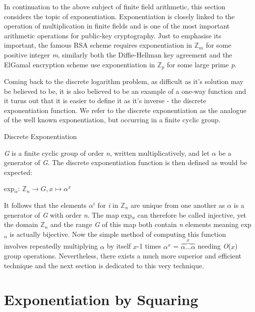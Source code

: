 \documentclass[iwp,first]{luthesis}
\begin{document}
In continuation to the above subject of finite field arithmetic, this section considers the topic of exponentiation. Exponentiation is closely linked to the operation of multiplication in finite fields and is one of the most important arithmetic operations for public-key cryptography. Just to emphasise its important, the famous RSA scheme requires exponentiation in $\mathbb{Z}_m$ for some positive integer \textit{m}, similarly both the Diffie-Hellman key agreement and the ElGamal encryption scheme use exponentiation in $\mathbb{Z}_p$ for some large prime \textit{p}.

Coming back to the discrete logarithm problem, as difficult as it's solution may be believed to be, it is also believed to be an example of a one-way function and it turns out that it is easier to define it as it's inverse - the discrete exponentiation function. We refer to the discrete exponentiation as the analogue of the well known exponentiation, but occurring in a finite cyclic group. 

\begin{mydef}
Discrete Exponentiation
\end{mydef}

\textit{G} is a finite cyclic group of order \textit{n}, written multiplicatively, and let $\alpha$ be a generator of \textit{G}. The discrete exponentiation function is then defined as would be expected:

\begin{center}
exp$_\alpha$: $\mathbb{Z}_n  \longrightarrow \textit{G},   \textit{x} \longmapsto \textit{$\alpha$}^x$
\end{center}

It follows that the elements $\alpha^i$ for \textit{i} in $\mathbb{Z}_n$ are unique from one another as $\alpha$ is a generator of \textit{G} with order \textit{n}. The map exp$_\alpha$ can therefore be called injective, yet the domain $\mathbb{Z}_n$ and the range \textit{G} of this map both contain \textit{n} elements meaning exp$_\alpha$ is actually bijective. Now the simple method of computing this function involves repeatedly multiplying \textit{$\alpha$} by itself $x$-1 times \textit{$\alpha$}$^x$ = $\overbrace{\alpha...\alpha}^x$ needing \textit{O}($x$) group operations. Nevertheless, there exists a much more superior and efficient technique and the next section is dedicated to this very technique.

\section{Exponentiation by Squaring}
\end{document}
